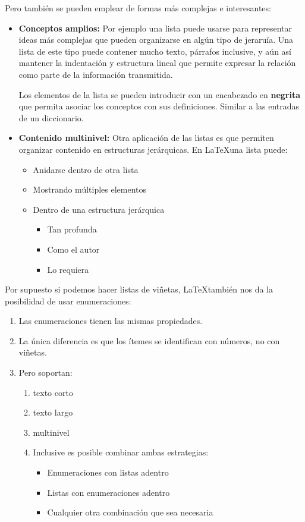 \documentclass{report}
\begin{document}
Pero también se pueden emplear de formas más complejas e interesantes:

\begin{itemize}
    \item \textbf{Conceptos amplios:} Por ejemplo una lista puede usarse para representar ideas más complejas que pueden organizarse en algún tipo de jeraruía. 
    Una lista de este tipo puede contener mucho texto, párrafos inclusive, y aún así mantener la indentación y estructura lineal que permite expresar la relación como parte de la información transmitida.
    
    Los elementos de la lista se pueden introducir con un encabezado en \textbf{negrita} que permita asociar los conceptos con sus definiciones. Similar a las entradas de un diccionario.
    
    \item \textbf{Contenido multinivel:} Otra aplicación de las listas es que permiten organizar contenido en estructuras jerárquicas. En \LaTeX una lista puede:
    
    \begin{itemize}
        \item Anidarse dentro de otra lista
        \item Mostrando múltiples elementos
        \item Dentro de una estructura jerárquica
        \begin{itemize}
            \item Tan profunda
            \item Como el autor
            \item Lo requiera
        \end{itemize}
    \end{itemize}
\end{itemize}

Por supuesto si podemos hacer listas de viñetas, \LaTeX también nos da la posibilidad de usar enumeraciones:

\begin{enumerate}
    \item Las enumeraciones tienen las mismas propiedades.
    \item La única diferencia es que los ítemes se identifican con números, no con viñetas.
    \item Pero soportan:
    \begin{enumerate}
        \item texto corto
        \item texto largo
        \item multinivel
        \item Inclusive es posible combinar ambas estrategias:
        \begin{itemize}
            \item Enumeraciones con listas adentro
            \item Listas con enumeraciones adentro
            \item Cualquier otra combinación que sea necesaria
            
        \end{itemize}
    \end{enumerate}
\end{enumerate}
\end{document}
